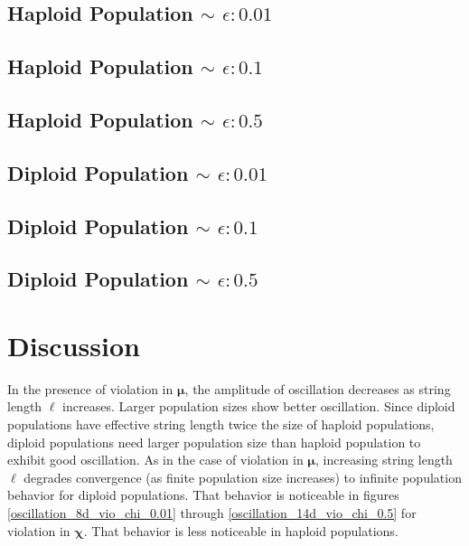 \subsection{Haploid Population $\mathtt{\sim}$ $\epsilon: 0.01$}

\subsection{Haploid Population $\mathtt{\sim}$ $\epsilon: 0.1$}

\subsection{Haploid Population $\mathtt{\sim}$ $\epsilon: 0.5$}


\subsection{Diploid Population $\mathtt{\sim}$ $\epsilon: 0.01$}

\subsection{Diploid Population $\mathtt{\sim}$ $\epsilon: 0.1$}

\subsection{Diploid Population $\mathtt{\sim}$ $\epsilon: 0.5$}


\section{Discussion}
In the presence of violation in $\bm{\mu}$, the amplitude of oscillation decreases 
as string length $\ell$ increases. 
Larger population sizes show better oscillation. 
Since diploid populations have effective string length twice the size of haploid populations, 
diploid populations need larger population size than haploid population to exhibit good oscillation. 
As in the case of violation in $\bm{\mu}$, increasing string length $\ell$ 
degrades convergence (as finite population size increases) to infinite population behavior for diploid populations. 
That behavior is noticeable in figures 
\ref{oscillation_8d_vio_chi_0.01} through \ref{oscillation_14d_vio_chi_0.5} for violation in $\bm{\chi}$. 
That behavior is less noticeable in haploid populations.

